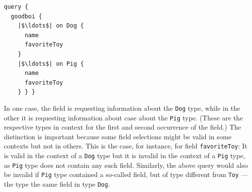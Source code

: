 \begin{verbatim}
query {
  goodboi {
    |$\ldots$| on Dog {
      name
      favoriteToy
    }
    |$\ldots$| on Pig {
      name
      favoriteToy
    } } }
\end{verbatim}



\noindent In one case, the field is requesting information about the \texttt{Dog} type, while in the other it is requesting information about case about the \texttt{Pig} type. (These are the respective types in context for the first and second occurrence of the field.) The distinction is important because some field selections might be valid in some contexts but not in others. This is the case, for instance, for field \texttt{favoriteToy}: It is valid in the context of a \texttt{Dog} type but it is invalid in the context of a \texttt{Pig} type, as \texttt{Pig} type does not contain any such field. Similarly, the above query would also be invalid if \texttt{Pig} type contained a so-called field, but of type different from \texttt{Toy} ---the type the same field in type \texttt{Dog}.



